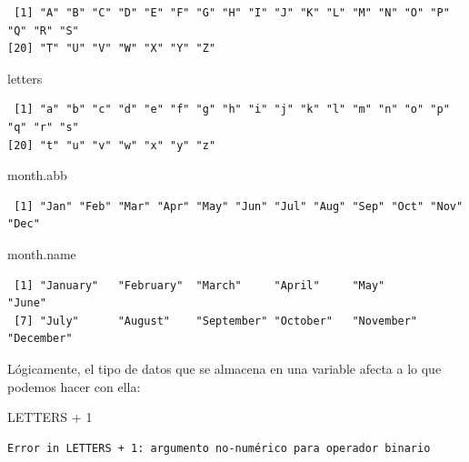 \documentclass[
  letterpaper,
  DIV=11,
  numbers=noendperiod]{scrreprt}
\newenvironment{Shaded}{\begin{snugshade}}{\end{snugshade}}
\newcommand{\DecValTok}[1]{\textcolor[rgb]{0.68,0.00,0.00}{#1}}
\newcommand{\NormalTok}[1]{\textcolor[rgb]{0.00,0.23,0.31}{#1}}
\newcommand{\SpecialCharTok}[1]{\textcolor[rgb]{0.37,0.37,0.37}{#1}}
\begin{document}
\begin{verbatim}
 [1] "A" "B" "C" "D" "E" "F" "G" "H" "I" "J" "K" "L" "M" "N" "O" "P" "Q" "R" "S"
[20] "T" "U" "V" "W" "X" "Y" "Z"
\end{verbatim}

\begin{Shaded}
\begin{Highlighting}[]
\NormalTok{letters}
\end{Highlighting}
\end{Shaded}

\begin{verbatim}
 [1] "a" "b" "c" "d" "e" "f" "g" "h" "i" "j" "k" "l" "m" "n" "o" "p" "q" "r" "s"
[20] "t" "u" "v" "w" "x" "y" "z"
\end{verbatim}

\begin{Shaded}
\begin{Highlighting}[]
\NormalTok{month.abb}
\end{Highlighting}
\end{Shaded}

\begin{verbatim}
 [1] "Jan" "Feb" "Mar" "Apr" "May" "Jun" "Jul" "Aug" "Sep" "Oct" "Nov" "Dec"
\end{verbatim}

\begin{Shaded}
\begin{Highlighting}[]
\NormalTok{month.name}
\end{Highlighting}
\end{Shaded}

\begin{verbatim}
 [1] "January"   "February"  "March"     "April"     "May"       "June"     
 [7] "July"      "August"    "September" "October"   "November"  "December" 
\end{verbatim}

Lógicamente, el tipo de datos que se almacena en una variable afecta a
lo que podemos hacer con ella:

\begin{Shaded}
\begin{Highlighting}[]
\NormalTok{LETTERS }\SpecialCharTok{+} \DecValTok{1}
\end{Highlighting}
\end{Shaded}

\begin{verbatim}
Error in LETTERS + 1: argumento no-numérico para operador binario
\end{verbatim}
\end{document}
